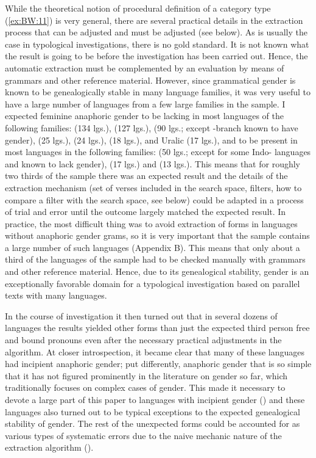 \documentclass[output=collectionpaper]{langsci/langscibook}
\begin{document}
While the theoretical notion of procedural definition of a category type (\ref{ex:BW:11}) is very general, there are several practical details in the extraction process that can be adjusted and must be adjusted (see below). As is usually the case in typological investigations, there is no gold standard. It is not known what the result is going to be before the investigation has been carried out. Hence, the automatic extraction must be complemented by an evaluation by means of grammars and other reference material. However, since grammatical gender is known to be genealogically stable in many language families, it was very useful to have a large number of languages from a few large families in the sample. I expected feminine anaphoric gender to be lacking in most languages of the following families:  (134 lgs.),  (127 lgs.),  (90 lgs.; except -branch known to have gender),  (25 lgs.),  (24 lgs.),  (18 lgs.),  and Uralic (17 lgs.), and to be present in most languages in the following families:  (50 lgs.; except for some Indo- languages and  known to lack gender),  (17 lgs.\@) and  (13 lgs.). This means that for roughly two thirds of the sample there was an expected result and the details of the extraction mechanism (set of verses included in the search space, filters, how to compare a filter with the search space, see below) could be adapted in a process of trial and error until the outcome largely matched the expected result. In practice, the most difficult thing was to avoid extraction of forms in languages without anaphoric gender grams, so it is very important that the sample contains a large number of such languages (Appendix B). This means that only about a third of the languages of the sample had to be checked manually with grammars and other reference material. Hence, due to its genealogical stability, gender is an exceptionally favorable domain for a typological investigation based on parallel texts with many languages.

In the course of investigation it then turned out that in several dozens of languages the results yielded other forms than just the expected third person free and bound pronouns even after the necessary practical adjustments in the algorithm. At closer introspection, it became clear that many of these languages had incipient anaphoric gender; put differently, anaphoric gender that is so simple that it has not figured prominently in the literature on gender so far, which traditionally focuses on complex cases of gender. This made it necessary to devote a large part of this paper to languages with incipient gender () and these languages also turned out to be typical exceptions to the expected genealogical stability of gender. The rest of the unexpected forms could be accounted for as various types of systematic errors due to the naive mechanic nature of the extraction algorithm ().
\end{document}
